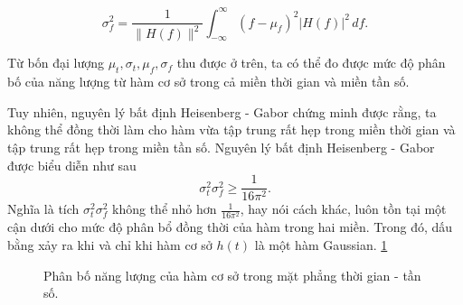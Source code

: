 \documentclass[12pt, a4paper]{report}
\begin{document}
\begin{equation}
    \sigma_f^2 = \frac{1}{\|H(f)\|^2} \int_{-\infty}^{\infty} (f - \mu_f)^2 |H(f)|^2 \, df.
\end{equation}

Từ bốn đại lượng $\mu_t,\sigma_t,\mu_f,\sigma_f$ thu được ở trên, ta có thể đo được mức độ phân bố của năng lượng từ hàm cơ sở trong cả miền thời gian và miền tần số.

Tuy nhiên, nguyên lý bất định Heisenberg - Gabor chứng minh được rằng, ta không thể đồng thời làm cho hàm vừa tập trung rất hẹp trong miền thời gian và tập trung rất hẹp trong miền tần số. Nguyên lý bất định Heisenberg - Gabor được biểu diễn như sau
\begin{equation}
    \sigma_t^2 \sigma_f^2 \ge \frac{1}{16\pi^2}.
\end{equation}
Nghĩa là tích $\sigma_t^{2}\sigma_f^{2}$ không thể nhỏ hơn $\frac{1}{16\pi^2}$, hay nói cách khác, luôn tồn tại một cận dưới cho mức độ phân bổ đồng thời của hàm trong hai miền. Trong đó, dấu bằng xảy ra khi và chỉ khi hàm cơ sở $h(t)$ là một hàm Gaussian. \ref{minhhoaphanbonltrongmptgiantanso}

\begin{figure}[htbp!]
  \centering
  \caption{Phân bố năng lượng của hàm cơ sở trong mặt phẳng thời gian - tần số. \label{minhhoaphanbonltrongmptgiantanso}}
\end{figure}
\end{document}
